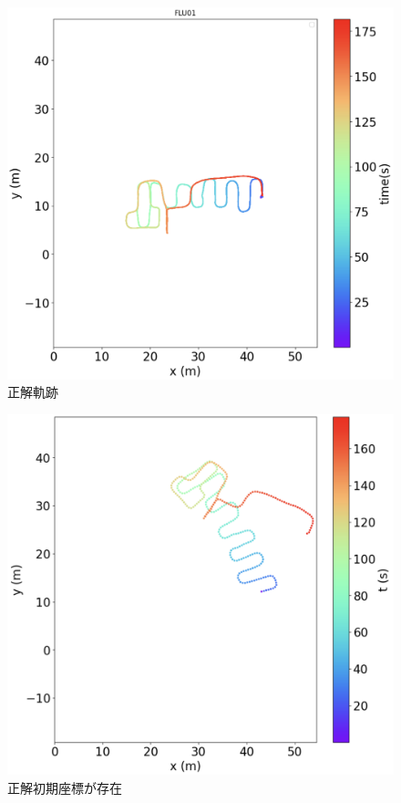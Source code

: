 \begin{figure}[ht]
	\centering
	\includegraphics[width=\linewidth]{image/gt2.jpg}
	\caption{正解軌跡}    \label{fig:gt-trajectory}
\end{figure}

\begin{figure}[ht]
	\centering
	\includegraphics[width=\linewidth]{image/pdr-move.jpg}
	\caption{正解初期座標が存在}    \label{fig:pdr-move}
\end{figure}






